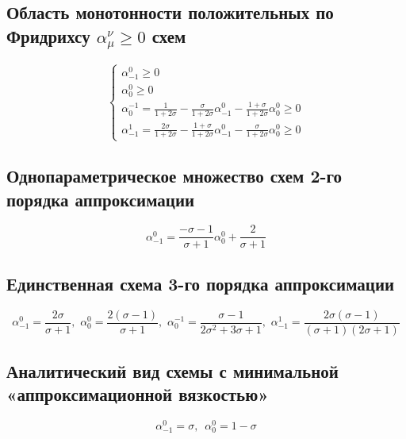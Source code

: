 \documentclass[a4paper, 12pt]{article} %
\begin{document}
\subsection{Область монотонности положительных по Фридрихсу $\alpha^\nu_\mu \geqslant 0$ схем}
\label{subsec:1t}
\begin{equation*}
 \begin{cases}
 	\alpha^{0}_{-1} \geqslant 0  \\  
 	\alpha^{0}_{0} \geqslant 0 \\
 	\alpha^{-1}_{0} = \frac{1}{1+2\sigma} - \frac{\sigma}{1 + 2\sigma}\alpha^{0}_{-1} - \frac{1 + \sigma}{1 + 2\sigma}\alpha^{0}_{0} \geqslant 0 \\
 	\alpha^{1}_{-1} = \frac{2\sigma}{1+2\sigma} - \frac{1 + \sigma}{1 + 2\sigma}\alpha^{0}_{-1} - \frac{\sigma}{1 + 2\sigma}\alpha^{0}_{0} \geqslant 0 
 \end{cases}
\end{equation*}

\subsection{Однопараметрическое множество схем 2-го порядка аппроксимации}
\label{subsec:2t}
$$\alpha^{0}_{-1} = \frac{-\sigma-1}{\sigma+1} \alpha^{0}_{0}+ \frac{2}{\sigma+1}$$

\subsection{Единственная схема 3-го порядка аппроксимации}
\label{subsec:3t}
$$\alpha^{0}_{-1} = \frac{2\sigma}{\sigma + 1},\,\, 
  \alpha^{0}_{0} = \frac{2(\sigma - 1)}{\sigma + 1}, \,\,
  \alpha^{-1}_{0} = \frac{\sigma - 1}{2\sigma^2 + 3\sigma + 1},\,\,
  \alpha^{1}_{-1} = \frac{2\sigma(\sigma-1)}{(\sigma+1)(2\sigma + 1)}$$



\subsection{Аналитический вид схемы с минимальной «аппроксимационной вязкостью»}
\label{subsec:4t}
$$\alpha^{0}_{-1} = \sigma, \,\,\, \alpha^{0}_{0} = 1-\sigma$$
\end{document}
